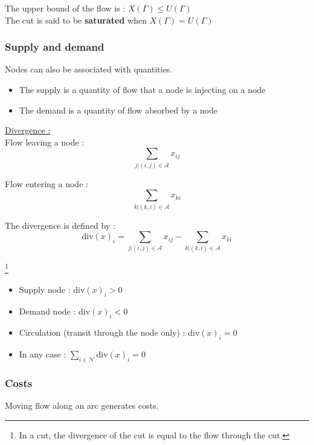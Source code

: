 \documentclass[../main.tex]{subfiles}
\begin{document}
The upper bound of the flow is : $X(\Gamma) \leq U(\Gamma)$\\
The cut is said to be \textbf{saturated} when $X(\Gamma) = U(\Gamma)$\\

\subsubsection{Supply and demand}
Nodes can also be associated with quantities. \begin{itemize}
    \item The supply is a quantity of flow that a node is injecting on a node\\
    \item The demand is a quantity of flow absorbed by a node\\
\end{itemize} 

\quad \underline{Divergence :}\\
Flow leaving a node : \begin{equation}
    \sum_{j\lvert (i,j)\in \mathcal{A}} x_{ij}
\end{equation}

Flow entering a node : \begin{equation}
    \sum_{k\lvert (k,i)\in \mathcal{A}} x_{ki}
\end{equation}

The divergence is defined by : \begin{equation}
    \text{div}(x)_i = \sum_{j\lvert (i,j)\in \mathcal{A}} x_{ij} - \sum_{k\lvert (k,i) \in \mathcal{A}} x_{ki}
\end{equation}

\footnote{In a cut, the divergence of the cut is equal to the flow through the cut.}

\begin{itemize}
    \item Supply node : div$(x)_i >0$\\
    \item Demand node : div$(x)_i<0$\\
    \item Circulation (transit through the node only) : div$(x)_i = 0$\\
    \item In any case : $\sum_{i\in \mathcal{N}}$div$(x)_i=0$\\
\end{itemize}

\subsubsection{Costs}
Moving flow along an arc generates costs.\\
\end{document}
